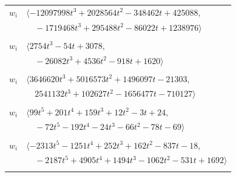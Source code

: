 \documentclass[11pt]{article}
\begin{document}
\begin{longtable}{@{}ll@{}}
$w_i$ & $\langle -12097998t^{3}+2028564t^{2}-348462t+425088,$\\
 & $\quad -1719468t^{3}+295488t^{2}-86022t+1238976\rangle$\\
\addlinespace[2pt]
\multicolumn{2}{@{}p{0.97\textwidth}@{}}{$i=34$, $D_i=3$, $e_i=1$, $\rho_{ij}$: $3{:}2, \allowbreak 4{:}1, \allowbreak 10{:}2, \allowbreak 23{:}2, \allowbreak 25{:}2, \allowbreak 30{:}1, \allowbreak 51{:}2, \allowbreak 62{:}2, \allowbreak 65{:}2$}\\
$w_i$ & $\langle 2754t^{3}-54t+3078,$\\
 & $\quad -26082t^{3}+4536t^{2}-918t+1620\rangle$\\
\addlinespace[2pt]
\multicolumn{2}{@{}p{0.97\textwidth}@{}}{$i=35$, $D_i=3$, $e_i=0$, $\rho_{ij}$: $0{:}1, \allowbreak 1{:}1, \allowbreak 6{:}1, \allowbreak 11{:}1, \allowbreak 16{:}2, \allowbreak 21{:}1, \allowbreak 26{:}2, \allowbreak 32{:}2, \allowbreak 33{:}1, \allowbreak 44{:}1, \allowbreak 45{:}1, \allowbreak 51{:}2, \allowbreak 62{:}1$}\\
$w_i$ & $\langle 3646620t^{3}+5016573t^{2}+1496097t-21303,$\\
 & $\quad 2541132t^{3}+102627t^{2}-1656477t-710127\rangle$\\
\addlinespace[2pt]
\multicolumn{2}{@{}p{0.97\textwidth}@{}}{$i=36$, $D_i=6$, $\rho_{ij}$: $4{:}2, \allowbreak 12{:}1, \allowbreak 21{:}2, \allowbreak 23{:}1, \allowbreak 33{:}1, \allowbreak 44{:}1, \allowbreak 46{:}2, \allowbreak 53{:}2, \allowbreak 69{:}1, \allowbreak 73{:}2$}\\
$w_i$ & $\langle 99t^{5}+201t^{4}+159t^{3}+12t^{2}-3t+24,$\\
 & $\quad -72t^{5}-192t^{4}-24t^{3}-66t^{2}-78t-69\rangle$\\
\addlinespace[2pt]
\multicolumn{2}{@{}p{0.97\textwidth}@{}}{$i=37$, $D_i=36$, $\rho_{ij}$: $1{:}1, \allowbreak 2{:}1, \allowbreak 12{:}2, \allowbreak 20{:}1, \allowbreak 21{:}1, \allowbreak 27{:}1, \allowbreak 28{:}1, \allowbreak 29{:}2, \allowbreak 30{:}1, \allowbreak 31{:}1, \allowbreak 41{:}1, \allowbreak 45{:}2, \allowbreak 47{:}2, \allowbreak 62{:}1$}\\
$w_i$ & $\langle -2313t^{5}-1251t^{4}+252t^{3}+162t^{2}-837t-18,$\\
 & $\quad -2187t^{5}+4905t^{4}+1494t^{3}-1062t^{2}-531t+1692\rangle$\\
\addlinespace[2pt]
\multicolumn{2}{@{}p{0.97\textwidth}@{}}{$i=38$, $D_i=12$, $\rho_{ij}$: $1{:}2, \allowbreak 4{:}2, \allowbreak 9{:}1, \allowbreak 11{:}1, \allowbreak 25{:}1, \allowbreak 26{:}1, \allowbreak 51{:}1, \allowbreak 60{:}1, \allowbreak 61{:}1, \allowbreak 64{:}2, \allowbreak 69{:}1$}\\

\end{longtable}
\end{document}
